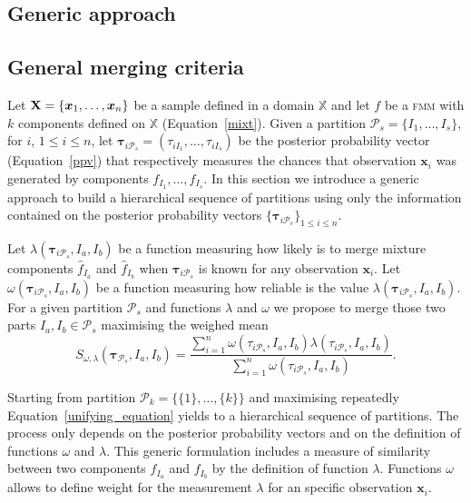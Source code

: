 \documentclass[10pt, a4paper]{article}
\theoremstyle{definition}
\newcommand{\m}[1]{\boldsymbol{#1}}
\newcommand{\fmm}{\textsc{fmm}\xspace}
\begin{document}
\begin{spacing}{1.9}
\section{Generic approach}\label{generic_merging}

\subsection{General merging criteria}\label{merging_criteria}

Let $\text{\textbf{X}} = \{\m x_1,\dots,\m x_n \}$ be a sample defined in  a domain $\mathbb{X}$ and let $f$ be a \fmm with $k$ components defined on $\mathbb{X}$ (Equation~\ref{mixt}). Given a partition $\mathcal{P}_s = \{I_1, \dots, I_s\}$, for $i$, $1\leq i \leq n $, let $\m\tau_{i \mathcal{P}_s}= \left( \tau_{i I_1} , \dots, \tau_{i I_s}  \right)$ be the posterior probability vector (Equation~\ref{ppv}) that respectively measures the chances that observation $\m x_i$ was generated by components $f_{I_1}, \dots, f_{I_s}$. In this section we introduce a generic approach to build a hierarchical sequence of partitions using only the information contained on the posterior probability vectors $\{\m\tau_{i \mathcal{P}_s}\}_{1\leq i \leq n}$.


Let $\lambda(\m\tau_{i \mathcal{P}_s},  I_a,  I_b)$ be a function measuring how likely is to merge mixture components $\hat{f}_{I_a}$ and $\hat{f}_{I_b}$ when $\m \tau_{i \mathcal{P}_s}$ is known for any observation $\m x_i$. Let $\omega(\m\tau_{i \mathcal{P}_s},  I_a,  I_b)$ be a function measuring how reliable is the value $\lambda(\m\tau_{i \mathcal{P}_s},  I_a,  I_b)$.  For a given partition $\mathcal{P}_s$ and functions $\lambda$ and $\omega$ we propose to merge those two parts $I_a, I_b \in \mathcal{P}_s$ maximising the weighed mean
\begin{equation}\label{unifying_equation}
S_{\omega, \lambda}( \m\tau_{\mathcal{P}_s},  I_a,  I_b) = \frac{\sum_{i=1}^n \omega(\tau_{i \mathcal{P}_s}, I_a, I_b) \lambda(\tau_{i \mathcal{P}_s}, I_a, I_b)}{\sum_{i=1}^n \omega(\tau_{i \mathcal{P}_s}, I_a, I_b) }.
\end{equation}


Starting from partition $\mathcal{P}_k = \{ \{1\}, \dots, \{k\} \}$ and maximising repeatedly Equation~\ref{unifying_equation} yields to a hierarchical sequence of partitions. The process only depends on the posterior probability vectors and on the definition of functions $\omega$ and $\lambda$. This generic formulation includes a measure of similarity between two components $f_{I_a}$ and $f_{I_b}$ by the definition of function $\lambda$. Functions $\omega$ allows to define weight for the measurement $\lambda$ for an specific observation $\m x_i$.


\end{spacing}
\end{document}
